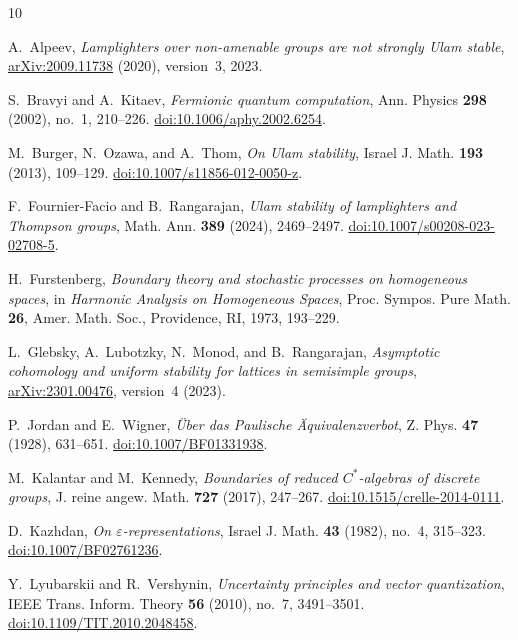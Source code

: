 \documentclass[11pt]{article}
\numberwithin{equation}{section}
\theoremstyle{definition}
\theoremstyle{remark}
\begin{document}
\begin{thebibliography}{10}
\raggedright
{}
A.~Alpeev,
\emph{Lamplighters over non-amenable groups are not strongly Ulam stable},
\href{https://arxiv.org/abs/2009.11738v3}{arXiv:2009.11738} (2020), version~3, 2023.

S.~Bravyi and A.~Kitaev,
\emph{Fermionic quantum computation},
Ann. Physics \textbf{298} (2002), no.~1, 210--226.
\href{https://doi.org/10.1006/aphy.2002.6254}{doi:10.1006/aphy.2002.6254}.

M.~Burger, N.~Ozawa, and A.~Thom,
\emph{On Ulam stability},
Israel J. Math. \textbf{193} (2013), 109--129.
\href{https://doi.org/10.1007/s11856-012-0050-z}{doi:10.1007/s11856-012-0050-z}.

F.~Fournier-Facio and B.~Rangarajan,
\emph{Ulam stability of lamplighters and Thompson groups},
Math. Ann. \textbf{389} (2024), 2469--2497.
\href{https://doi.org/10.1007/s00208-023-02708-5}{doi:10.1007/s00208-023-02708-5}.

H.~Furstenberg,
\emph{Boundary theory and stochastic processes on homogeneous spaces},
in \emph{Harmonic Analysis on Homogeneous Spaces},
Proc. Sympos. Pure Math. \textbf{26}, Amer. Math. Soc., Providence, RI,
1973, 193--229.

L.~Glebsky, A.~Lubotzky, N.~Monod, and B.~Rangarajan,
\emph{Asymptotic cohomology and uniform stability for lattices in semisimple groups},
\href{https://arxiv.org/abs/2301.00476v4}{arXiv:2301.00476}, version~4 (2023).

P.~Jordan and E.~Wigner,
\emph{{\"U}ber das Paulische {\"A}quivalenzverbot},
Z. Phys. \textbf{47} (1928), 631--651.
\href{https://doi.org/10.1007/BF01331938}{doi:10.1007/BF01331938}.

M.~Kalantar and M.~Kennedy,
\emph{Boundaries of reduced $C^*$-algebras of discrete groups},
J. reine angew. Math. \textbf{727} (2017), 247--267.
\href{https://doi.org/10.1515/crelle-2014-0111}{doi:10.1515/crelle-2014-0111}.

D.~Kazhdan,
\emph{On $\varepsilon$-representations},
Israel J. Math. \textbf{43} (1982), no.~4, 315--323.
\href{https://doi.org/10.1007/BF02761236}{doi:10.1007/BF02761236}.

Y.~Lyubarskii and R.~Vershynin,
\emph{Uncertainty principles and vector quantization},
IEEE Trans. Inform. Theory \textbf{56} (2010), no.~7, 3491--3501.
\href{https://doi.org/10.1109/TIT.2010.2048458}{doi:10.1109/TIT.2010.2048458}.
\end{thebibliography}
\end{document}
